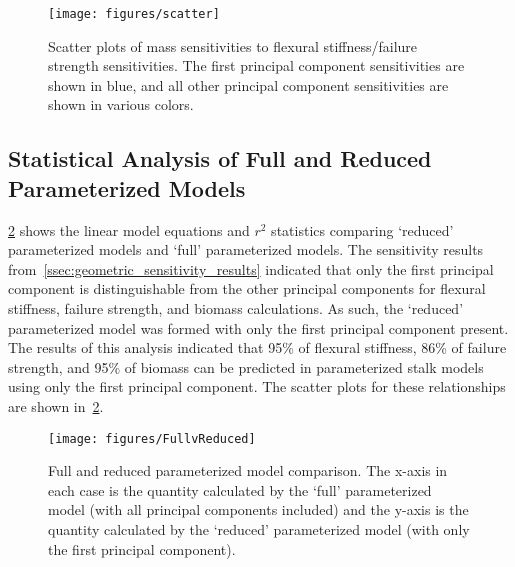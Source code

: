 \begin{figure}[htbp]
	\centering
	\texttt{[image: figures/scatter]}
	\caption[Scatter plots of mass sensitivities to flexural stiffness/failure strength sensitivities.]{Scatter plots of mass sensitivities to flexural stiffness/failure strength sensitivities. The first principal component sensitivities are shown in blue, and all other principal component sensitivities are shown in various colors.}
	\label{fig:scatter}
\end{figure}

\subsection{Statistical Analysis of Full and Reduced Parameterized Models}
\label{ssec:statistical_analysis_of_full_and_reduced_parameterized_models}
\cref{fig:FullvReduced} shows the linear model equations and ${r^{2}}$ statistics comparing ‘reduced’ parameterized models and ‘full’ parameterized models. The sensitivity results from~\cref{ssec:geometric_sensitivity_results} indicated that only the first principal component is distinguishable from the other principal components for flexural stiffness, failure strength, and biomass calculations. As such, the ‘reduced’ parameterized model was formed with only the first principal component present. The results of this analysis indicated that 95\% of flexural stiffness, 86\% of failure strength, and 95\% of biomass can be predicted in parameterized stalk models using only the first principal component. The scatter plots for these relationships are shown in~\cref{fig:FullvReduced}.

\begin{figure}[htbp]
	\centering
	\texttt{[image: figures/FullvReduced]}
	\caption[Full and reduced parameterized model comparison.]{Full and reduced parameterized model comparison. The x-axis in each case is the quantity calculated by the ‘full’ parameterized model (with all principal components included) and the y-axis is the quantity calculated by the ‘reduced’ parameterized model (with only the first principal component).}
	\label{fig:FullvReduced}
\end{figure}

